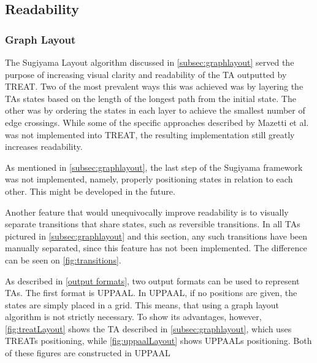 \subsection{Readability}\label{subsec:readability}

\subsubsection{Graph Layout}
The Sugiyama Layout algorithm discussed in \cref{subsec:graphlayout} served the purpose of increasing visual clarity and readability of the TA outputted by TREAT.
Two of the most prevalent ways this was achieved was by layering the TAs states based on the length of the longest path from the initial state. The other was by ordering the states in each layer to achieve the smallest number of edge crossings.
While some of the specific approaches described by Mazetti et al. \cite{Mazetti2012} was not implemented into TREAT, the resulting implementation still greatly increases readability.

As mentioned in \cref{subsec:graphlayout}, the last step of the Sugiyama framework was not implemented, namely, properly positioning states in relation to each other. This might be developed in the future.

Another feature that would unequivocally improve readability is to visually separate transitions that share states, such as reversible transitions.
In all TAs pictured in \cref{subsec:graphlayout} and this section, any such transitions have been manually separated, since this feature has not been implemented. The difference can be seen on \cref{fig:transitions}.

\begin{center}
    
\end{center}

As described in \cref{output formats}, two output formats can be used to represent TAs.
The first format is UPPAAL. In UPPAAL, if no positions are given, the states are simply placed in a grid. This means, that using a graph layout algorithm is not strictly necessary.
To show its advantages, however, \cref{fig:treatLayout} shows the TA described in \cref{subsec:graphlayout}, which uses TREATs positioning, while \cref{fig:uppaalLayout} shows UPPAALs positioning. Both of these figures are constructed in UPPAAL

